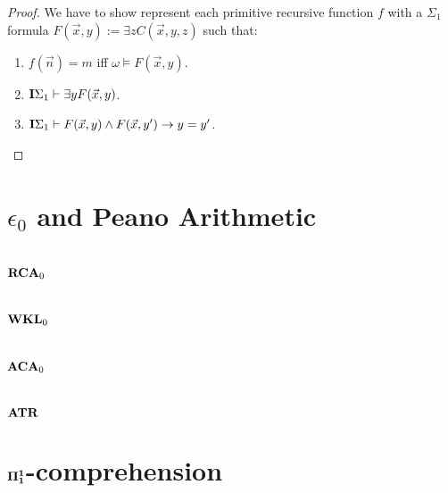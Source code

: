 \documentclass[8pt]{article}
\theoremstyle{definition}
\theoremstyle{definition}
\theoremstyle{definition}
\theoremstyle{definition}
\theoremstyle{definition}
\theoremstyle{definition}
\theoremstyle{definition}
\theoremstyle{definition}
\theoremstyle{definition}
\theoremstyle{definition}
\theoremstyle{definition}
\theoremstyle{definition}
\theoremstyle{definition}
\theoremstyle{question}
\begin{document}
\begin{proof}
  We have to show represent each primitive recursive function $f$ with a $\Sigma_1$ formula 
  $F(\vec{x}, y) := \exists z C(\vec{x}, y, z)$ such that:
  \begin{enumerate}
    \item $f(\vec{n}) = m$ iff $\omega \models F(\vec{x}, y)$.
    \item ${\bf I}\Sigma_1 \vdash \exists y F(\vec{x}, y)$.
    \item ${\bf I}\Sigma_1 \vdash F(\vec{x}, y) \land F(\vec{x}, y') \to y = y'$.
  \end{enumerate}

\end{proof}

\section{$\epsilon_0$ and Peano Arithmetic}

\section{${\bf RCA}_0$}

\section{${\bf WKL}_0$}

\section{${\bf ACA}_0$}

\section{${\bf ATR}$}

\section{${\bf \Pi_1^1}$-comprehension}




\end{document}
